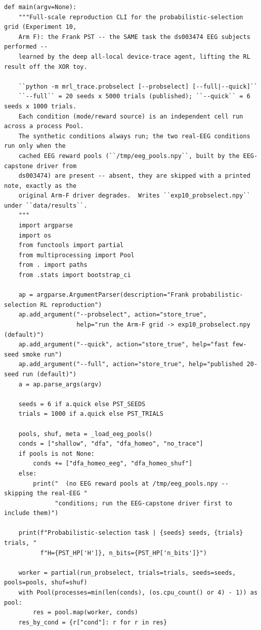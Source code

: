 \begin{lstlisting}[caption={mrl\_trace/probselect.py},label={lst:siox-src-probselect}]
def main(argv=None):
    """Full-scale reproduction CLI for the probabilistic-selection grid (Experiment 10,
    Arm F): the Frank PST -- the SAME task the ds003474 EEG subjects performed --
    learned by the deep all-local device-trace agent, lifting the RL result off the XOR toy.

    ``python -m mrl_trace.probselect [--probselect] [--full|--quick]``
    ``--full`` = 20 seeds x 5000 trials (published); ``--quick`` = 6 seeds x 1000 trials.
    Each condition (mode/reward source) is an independent cell run across a process Pool.
    The synthetic conditions always run; the two real-EEG conditions run only when the
    cached EEG reward pools (``/tmp/eeg_pools.npy``, built by the EEG-capstone driver from
    ds003474) are present -- absent, they are skipped with a printed note, exactly as the
    original Arm-F driver degrades.  Writes ``exp10_probselect.npy`` under ``data/results``.
    """
    import argparse
    import os
    from functools import partial
    from multiprocessing import Pool
    from . import paths
    from .stats import bootstrap_ci

    ap = argparse.ArgumentParser(description="Frank probabilistic-selection RL reproduction")
    ap.add_argument("--probselect", action="store_true",
                    help="run the Arm-F grid -> exp10_probselect.npy (default)")
    ap.add_argument("--quick", action="store_true", help="fast few-seed smoke run")
    ap.add_argument("--full", action="store_true", help="published 20-seed run (default)")
    a = ap.parse_args(argv)

    seeds = 6 if a.quick else PST_SEEDS
    trials = 1000 if a.quick else PST_TRIALS

    pools, shuf, meta = _load_eeg_pools()
    conds = ["shallow", "dfa", "dfa_homeo", "no_trace"]
    if pools is not None:
        conds += ["dfa_homeo_eeg", "dfa_homeo_shuf"]
    else:
        print("  (no EEG reward pools at /tmp/eeg_pools.npy -- skipping the real-EEG "
              "conditions; run the EEG-capstone driver first to include them)")

    print(f"Probabilistic-selection task | {seeds} seeds, {trials} trials, "
          f"H={PST_HP['H']}, n_bits={PST_HP['n_bits']}")

    worker = partial(run_probselect, trials=trials, seeds=seeds, pools=pools, shuf=shuf)
    with Pool(processes=min(len(conds), (os.cpu_count() or 4) - 1)) as pool:
        res = pool.map(worker, conds)
    res_by_cond = {r["cond"]: r for r in res}


\end{lstlisting}

